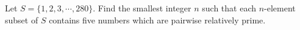 Let $ S = \{1,2,3,\cdots ,280\}$. Find the smallest integer $ n$ such that each $ n$-element subset of $ S$ contains five numbers which are pairwise relatively prime.